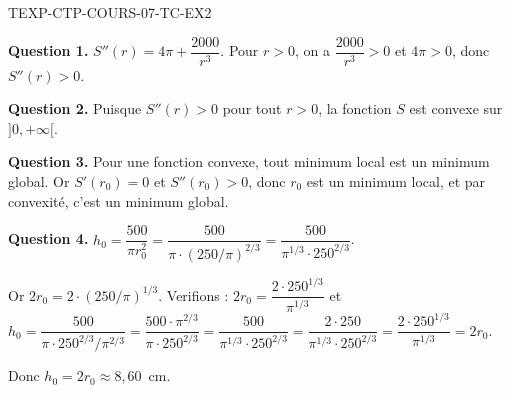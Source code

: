\begin{corrige}{TEXP-CTP-COURS-07-TC-EX2}

\textbf{Question 1.} $S''(r) = 4\pi + \dfrac{2000}{r^3}$. Pour $r > 0$, on a $\dfrac{2000}{r^3} > 0$ et $4\pi > 0$, donc $S''(r) > 0$.

\textbf{Question 2.} Puisque $S''(r) > 0$ pour tout $r > 0$, la fonction $S$ est convexe sur $]0, +\infty[$.

\textbf{Question 3.} Pour une fonction convexe, tout minimum local est un minimum global. Or $S'(r_0) = 0$ et $S''(r_0) > 0$, donc $r_0$ est un minimum local, et par convexité, c'est un minimum global.

\textbf{Question 4.} $h_0 = \dfrac{500}{\pi r_0^2} = \dfrac{500}{\pi \cdot (250/\pi)^{2/3}} = \dfrac{500}{\pi^{1/3} \cdot 250^{2/3}}$.

Or $2r_0 = 2 \cdot (250/\pi)^{1/3}$. Verifions : $2r_0 = \dfrac{2 \cdot 250^{1/3}}{\pi^{1/3}}$ et $h_0 = \dfrac{500}{\pi \cdot 250^{2/3}/\pi^{2/3}} = \dfrac{500 \cdot \pi^{2/3}}{\pi \cdot 250^{2/3}} = \dfrac{500}{\pi^{1/3} \cdot 250^{2/3}} = \dfrac{2 \cdot 250}{\pi^{1/3} \cdot 250^{2/3}} = \dfrac{2 \cdot 250^{1/3}}{\pi^{1/3}} = 2r_0$.

Donc $h_0 = 2r_0 \approx 8{,}60$~cm.

\end{corrige}
